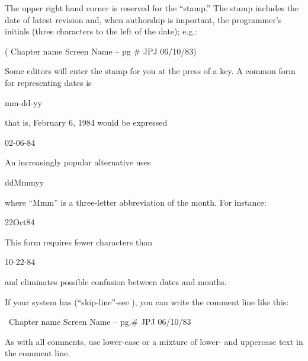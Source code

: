 The upper right hand corner is reserved for the ``stamp.'' The stamp
includes the date of latest revision and, when authorship is important,
the programmer's initials (three characters to the left of the date); e.g.:
\begin{Code}
( Chapter name          Screen Name -- pg #       JPJ 06/10/83)
\end{Code}
Some \Forth{} editors will enter the stamp for you at the press of a key.
A common form for representing dates is
\begin{Code}
mm-dd-yy
\end{Code}
that is, February 6, 1984 would be expressed
\begin{Code}
02-06-84
\end{Code}
An increasingly popular alternative uses
\begin{Code}
ddMmmyy
\end{Code}
where ``Mmm'' is a three-letter abbreviation of the month.  For instance:
\begin{Code}
22Oct84
\end{Code}
This form requires fewer characters than
\begin{Code}
10-22-84
\end{Code}
and eliminates possible confusion between dates and months.

If your system has \forth{\backslash} (``skip-line''-see ), you can write
the comment line like this:
\begin{Code}
\ Chapter name          Screen Name -- pg.#         JPJ 06/10/83
\end{Code}
As with all comments, use lower-case or a mixture of lower- and uppercase
text in the comment line.

